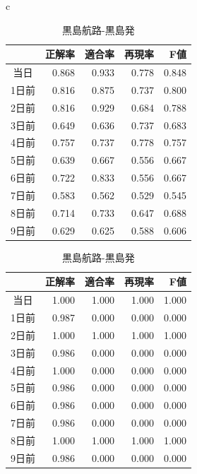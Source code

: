 \begin{table}[htbp]
  \begin{center}
    \begin{tabular}{c}
      \begin{minipage}{0.5\hsize}
        \begin{center}
          \caption{鳩間島航路-鳩間発}
          \begin{tabular}{|c|r|r|r|r|} \hline
   &正解率 & 適合率 & 再現率 & F値 \\ \hline
      当日&0.868 &0.933 &0.778 &0.848 \\ \hline
     1日前 & 0.816 & 0.875 & 0.737 & 0.800 \\ \hline
      2日前 & 0.816 & 0.929 & 0.684 & 0.788 \\ \hline
      3日前 & 0.649 & 0.636 & 0.737 & 0.683 \\ \hline 
      4日前 & 0.757 & 0.737 & 0.778 & 0.757 \\ \hline 
      5日前 & 0.639 & 0.667 & 0.556 & 0.667 \\ \hline 
      6日前 & 0.722 & 0.833 & 0.556 & 0.667 \\ \hline 
      7日前 & 0.583 & 0.562 & 0.529 & 0.545 \\ \hline 
      8日前 & 0.714 & 0.733 & 0.647 & 0.688 \\ \hline 
      9日前 & 0.629 & 0.625 & 0.588 & 0.606 \\ \hline 
          \end{tabular}
          \label{value_hatoma}
        \end{center}
      \end{minipage}
      \begin{minipage}{0.5\hsize}
        \begin{center}
          \caption{黒島航路-黒島発}
    \begin{tabular}{|c|r|r|r|r|} \hline
   &正解率 & 適合率 & 再現率 & F値 \\ \hline
      当日 & 1.000 & 1.000 & 1.000 & 1.000 \\ \hline
     1日前 & 0.987 & 0.000& 0.000 & 0.000 \\ \hline
      2日前 & 1.000 & 1.000 & 1.000 & 1.000 \\ \hline
      3日前 & 0.986 & 0.000 & 0.000 & 0.000 \\ \hline 
      4日前 & 1.000 & 0.000 & 0.000 & 0.000 \\ \hline 
      5日前 & 0.986 & 0.000 & 0.000 & 0.000 \\ \hline 
      6日前 & 0.986 & 0.000 & 0.000 & 0.000 \\ \hline 
      7日前 & 0.986 & 0.000 & 0.000 & 0.000 \\ \hline 
      8日前 & 1.000 & 1.000 & 1.000 & 1.000 \\ \hline 
      9日前 & 0.986 & 0.000 & 0.000 & 0.000 \\ \hline 
          \end{tabular}
           \label{value_kurosima}
        \end{center}
      \end{minipage}


\end{tabular}
\end{center}
\end{table}
